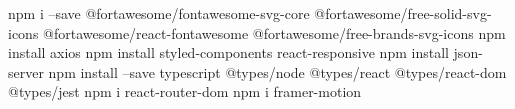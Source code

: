 npm i --save @fortawesome/fontawesome-svg-core 
    @fortawesome/free-solid-svg-icons 
    @fortawesome/react-fontawesome
    @fortawesome/free-brands-svg-icons
npm install axios
npm install styled-components react-responsive
npm install json-server
npm install --save typescript @types/node @types/react @types/react-dom @types/jest
npm i react-router-dom
 npm i framer-motion